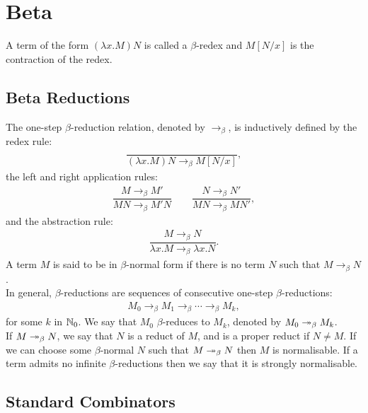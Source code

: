 \section{Beta}

A term of the form $(\lambda x.M)N$ is called a $\beta$-redex
and $M[N/x]$ is the contraction of the redex.

\subsection{Beta Reductions}

The one-step $\beta$-reduction relation, denoted by 
$\to_\beta$, is inductively defined by the redex rule: 
\begin{align*}
    \dfrac{}{
        (\lambda x.M)N \to_\beta M[N/x]
    },
\end{align*} the left and right application rules: \begin{align*}
    \dfrac{M \to_\beta M'}{MN \to_\beta M'N}
    \qquad
    \dfrac{N \to_\beta N'}{MN \to_\beta MN'},
\end{align*} and the abstraction rule:
\begin{align*}
    \dfrac{M \to_\beta N}{\lambda x.M \to_\beta \lambda x.N}.
\end{align*} A term $M$ is said to be in $\beta$-normal form 
if there is no term $N$ such that $M \to_\beta N$.
\\[\baselineskip]
In general, $\beta$-reductions are sequences of consecutive
one-step $\beta$-reductions: \begin{align*}
    M_0 \to_\beta M_1 \to_\beta \cdots \to_\beta M_k,
\end{align*} for some $k$ in $\mathbb{N}_0$. We say that
$M_0$ $\beta$-reduces to $M_k$, denoted by 
$M_0 \twoheadrightarrow_\beta M_k$.
\\[\baselineskip]
If $M \twoheadrightarrow_\beta N$, we say that $N$ is a
reduct of $M$, and is a proper reduct if $N \neq M$.
If we can choose some $\beta$-normal $N$ such that
$M \twoheadrightarrow_\beta N$ then $M$ is normalisable.
If a term admits no infinite $\beta$-reductions then we say
that it is strongly normalisable. 

\subsection{Standard Combinators}

